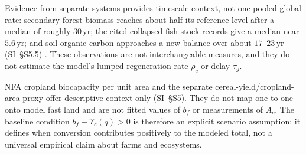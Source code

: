 \documentclass[preprint,12pt,authoryear]{elsarticle}
\newcommand{\Ups}{\Upsilon_c}
\begin{document}
Evidence from separate systems provides timescale context, not one pooled global rate: secondary-forest biomass reaches about half its reference level after a median of roughly $30$\,yr; the cited collapsed-fish-stock records give a median near $5.6$\,yr; and soil organic carbon approaches a new balance over about $17$--$23$\,yr (SI~\S S5.5) \citep{Poorter2016,HutchingsReynolds2004,Neubauer2013,Poeplau2011}. These observations are not interchangeable measures, and they do not estimate the model's lumped regeneration rate $\rho_c$ or delay $\tau_g$.

NFA cropland biocapacity per unit area and the separate cereal-yield/cropland-area proxy offer descriptive context only (SI~\S S5). They do not map one-to-one onto model fast land and are not fitted values of $b_f$ or measurements of $A_c$. The baseline condition $b_f-\Ups(q)>0$ is therefore an explicit scenario assumption: it defines when conversion contributes positively to the modeled total, not a universal empirical claim about farms and ecosystems.
\end{document}
